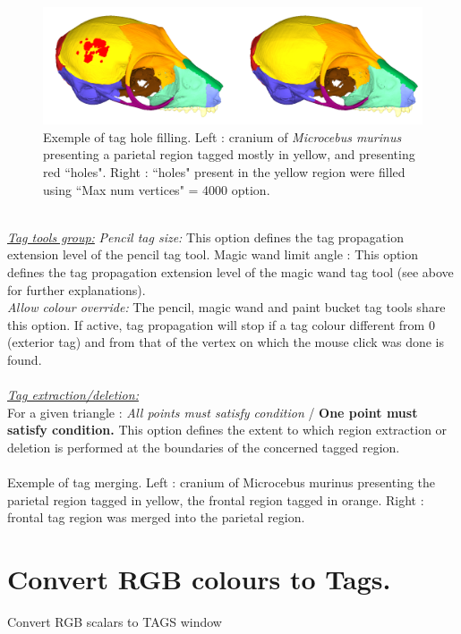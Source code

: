\begin{figure}
  \centering
  \includegraphics[scale=0.3]{images/Tags/Fill_holes2.png} 
	\caption{Exemple of tag hole filling. Left : cranium of \textit{Microcebus murinus} presenting a parietal region tagged mostly in yellow, and presenting red ``holes". Right : ``holes" present in the yellow region were filled using ``Max num vertices" = 4000 option.
}
\label{tag_fill_holes_example}
 \end{figure}
\\
\noindent
\textit{\underline{Tag tools group:}}
\textit{Pencil tag size:} This option defines the tag propagation extension
level of the pencil tag tool. Magic wand limit angle : This option defines the tag propagation extension level of the magic wand tag tool (see above for further explanations).\\
\textit{Allow colour override:} The pencil, magic wand and paint bucket tag tools share this option. If active, tag propagation will stop if a tag colour different from 0 (exterior tag) and from that of the vertex on which the mouse click was done is found.\\
\\
\noindent
\textit{\underline{Tag extraction/deletion:}}\\
For a given triangle : \textit{All points must satisfy condition} / \textbf{One point must satisfy condition.} This option defines the extent to which region extraction or deletion is performed at the boundaries of the concerned tagged region.\\\\
\noindent
Exemple of tag merging. Left : cranium of Microcebus murinus presenting the parietal region
tagged in yellow, the frontal region tagged in orange. Right : frontal tag region was merged into the parietal region.


\section{Convert RGB colours to Tags.}
Convert RGB scalars to TAGS window

